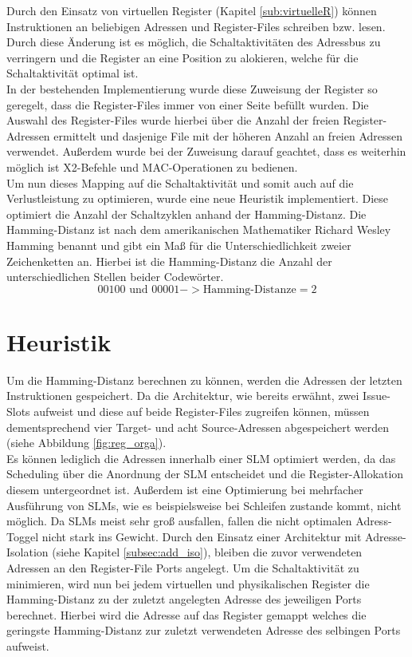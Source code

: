 Durch den Einsatz von virtuellen Register (Kapitel \ref{sub:virtuelleR}) können Instruktionen an beliebigen Adressen und Register-Files schreiben bzw. lesen. Durch diese Änderung ist es möglich, die Schaltaktivitäten des Adressbus zu verringern und die Register an eine Position zu alokieren, welche für die Schaltaktivität optimal ist.\\
In der bestehenden Implementierung wurde diese Zuweisung der Register so geregelt, dass die Register-Files immer von einer Seite befüllt wurden. Die Auswahl des Register-Files wurde hierbei über die Anzahl der freien Register-Adressen ermittelt und dasjenige File mit der höheren Anzahl an freien Adressen verwendet. Außerdem wurde bei der Zuweisung darauf geachtet, dass es weiterhin möglich ist X2-Befehle und MAC-Operationen zu bedienen.\\
Um nun dieses Mapping auf die Schaltaktivität und somit auch auf die Verlustleistung zu optimieren, wurde eine neue Heuristik implementiert.
Diese optimiert die Anzahl der Schaltzyklen anhand der Hamming-Distanz.
Die Hamming-Distanz ist nach dem amerikanischen Mathematiker Richard Wesley Hamming benannt und gibt ein Maß für die Unterschiedlichkeit zweier Zeichenketten an. Hierbei ist die Hamming-Distanz die Anzahl der unterschiedlichen Stellen beider Codewörter.
\begin{equation}
00100 \text{ und } 00001 -> \text{Hamming-Distanze}= 2
\label{eq:hammingdistanze}
\end{equation}
 
\section{Heuristik}
\label{sec:Heuristik}
Um die Hamming-Distanz berechnen zu können, werden die Adressen der letzten Instruktionen gespeichert. Da die Architektur, wie bereits erwähnt, zwei Issue-Slots aufweist und diese auf beide Register-Files zugreifen können, müssen dementsprechend vier Target- und acht Source-Adressen abgespeichert werden (siehe Abbildung \ref{fig:reg_orga}).\\
Es können lediglich die Adressen innerhalb einer SLM optimiert werden, da das Scheduling über die Anordnung der SLM entscheidet und die Register-Allokation diesem untergeordnet ist. Außerdem ist eine Optimierung bei mehrfacher Ausführung von SLMs, wie es beispielsweise bei Schleifen zustande kommt, nicht möglich. Da SLMs meist sehr groß ausfallen, fallen die nicht optimalen Adress-Toggel nicht stark ins Gewicht. 
Durch den Einsatz einer Architektur mit Adresse-Isolation (siehe Kapitel \ref{subsec:add_iso}), bleiben die zuvor verwendeten Adressen an den Register-File Ports angelegt. Um die Schaltaktivität zu minimieren, wird nun bei jedem virtuellen und physikalischen Register die Hamming-Distanz zu der zuletzt angelegten Adresse des jeweiligen Ports berechnet. Hierbei wird die Adresse auf das Register gemappt welches die geringste Hamming-Distanz zur zuletzt verwendeten Adresse des selbingen Ports aufweist.\\

